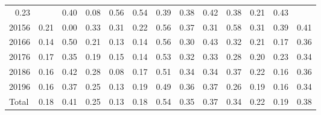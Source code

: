\begin{table}[!h]
\begin{tabular}{lllllllllllll}
  \multicolumn{1}{|r}{0.23} &
  \multicolumn{1}{r}{} &
  \multicolumn{1}{r}{0.40} &
  \multicolumn{1}{r}{0.08} &
  \multicolumn{1}{r}{0.56} &
  \multicolumn{1}{r}{0.54} &
  \multicolumn{1}{r}{0.39} &
  \multicolumn{1}{r}{0.38} &
  \multicolumn{1}{r}{0.42} &
  \multicolumn{1}{r}{0.38} &
  \multicolumn{1}{r}{0.21} &
  \multicolumn{1}{r}{0.43} \\
\multicolumn{1}{l}{\hspace{1em}20156} &
  \multicolumn{1}{|r}{0.21} &
  \multicolumn{1}{r}{0.00} &
  \multicolumn{1}{r}{0.33} &
  \multicolumn{1}{r}{0.31} &
  \multicolumn{1}{r}{0.22} &
  \multicolumn{1}{r}{0.56} &
  \multicolumn{1}{r}{0.37} &
  \multicolumn{1}{r}{0.31} &
  \multicolumn{1}{r}{0.58} &
  \multicolumn{1}{r}{0.31} &
  \multicolumn{1}{r}{0.39} &
  \multicolumn{1}{r}{0.41} \\
\multicolumn{1}{l}{\hspace{1em}20166} &
  \multicolumn{1}{|r}{0.14} &
  \multicolumn{1}{r}{0.50} &
  \multicolumn{1}{r}{0.21} &
  \multicolumn{1}{r}{0.13} &
  \multicolumn{1}{r}{0.14} &
  \multicolumn{1}{r}{0.56} &
  \multicolumn{1}{r}{0.30} &
  \multicolumn{1}{r}{0.43} &
  \multicolumn{1}{r}{0.32} &
  \multicolumn{1}{r}{0.21} &
  \multicolumn{1}{r}{0.17} &
  \multicolumn{1}{r}{0.36} \\
\multicolumn{1}{l}{\hspace{1em}20176} &
  \multicolumn{1}{|r}{0.17} &
  \multicolumn{1}{r}{0.35} &
  \multicolumn{1}{r}{0.19} &
  \multicolumn{1}{r}{0.15} &
  \multicolumn{1}{r}{0.14} &
  \multicolumn{1}{r}{0.53} &
  \multicolumn{1}{r}{0.32} &
  \multicolumn{1}{r}{0.33} &
  \multicolumn{1}{r}{0.28} &
  \multicolumn{1}{r}{0.20} &
  \multicolumn{1}{r}{0.23} &
  \multicolumn{1}{r}{0.34} \\
\multicolumn{1}{l}{\hspace{1em}20186} &
  \multicolumn{1}{|r}{0.16} &
  \multicolumn{1}{r}{0.42} &
  \multicolumn{1}{r}{0.28} &
  \multicolumn{1}{r}{0.08} &
  \multicolumn{1}{r}{0.17} &
  \multicolumn{1}{r}{0.51} &
  \multicolumn{1}{r}{0.34} &
  \multicolumn{1}{r}{0.34} &
  \multicolumn{1}{r}{0.37} &
  \multicolumn{1}{r}{0.22} &
  \multicolumn{1}{r}{0.16} &
  \multicolumn{1}{r}{0.36} \\
\multicolumn{1}{l}{\hspace{1em}20196} &
  \multicolumn{1}{|r}{0.16} &
  \multicolumn{1}{r}{0.37} &
  \multicolumn{1}{r}{0.25} &
  \multicolumn{1}{r}{0.13} &
  \multicolumn{1}{r}{0.19} &
  \multicolumn{1}{r}{0.49} &
  \multicolumn{1}{r}{0.36} &
  \multicolumn{1}{r}{0.37} &
  \multicolumn{1}{r}{0.26} &
  \multicolumn{1}{r}{0.19} &
  \multicolumn{1}{r}{0.16} &
  \multicolumn{1}{r}{0.34} \\
\multicolumn{1}{l}{\hspace{1em}Total} &
  \multicolumn{1}{|r}{0.18} &
  \multicolumn{1}{r}{0.41} &
  \multicolumn{1}{r}{0.25} &
  \multicolumn{1}{r}{0.13} &
  \multicolumn{1}{r}{0.18} &
  \multicolumn{1}{r}{0.54} &
  \multicolumn{1}{r}{0.35} &
  \multicolumn{1}{r}{0.37} &
  \multicolumn{1}{r}{0.34} &
  \multicolumn{1}{r}{0.22} &
  \multicolumn{1}{r}{0.19} &
  \multicolumn{1}{r}{0.38} \\
\cline{1-13}
\end{tabular}
\end{table}
